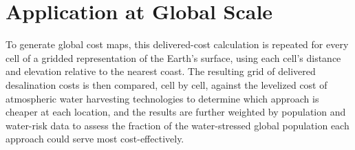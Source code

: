 \documentclass[11pt]{article}
\begin{document}
\section{Application at Global Scale}

To generate global cost maps, this delivered-cost calculation is repeated for
every cell of a gridded representation of the Earth's surface, using each
cell's distance and elevation relative to the nearest coast. The resulting
grid of delivered desalination costs is then compared, cell by cell, against
the levelized cost of atmospheric water harvesting technologies to determine
which approach is cheaper at each location, and the results are further
weighted by population and water-risk data to assess the fraction of the
water-stressed global population each approach could serve most
cost-effectively.
\end{document}

